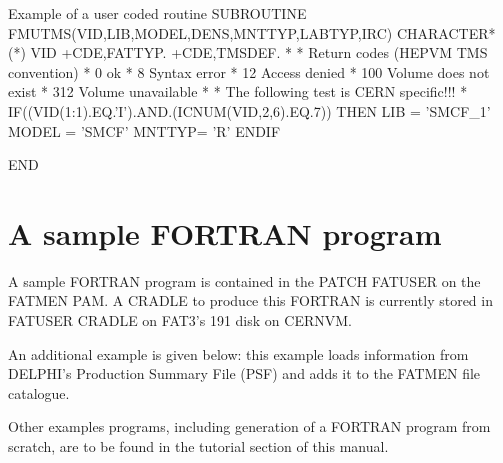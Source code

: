 \begin{XMPt}{Example of a user coded \protect{} routine}
      SUBROUTINE FMUTMS(VID,LIB,MODEL,DENS,MNTTYP,LABTYP,IRC)
      CHARACTER*(*) VID
+CDE,FATTYP.
+CDE,TMSDEF.
*
*     Return codes (HEPVM TMS convention)
*                   0   ok
*                   8   Syntax error
*                   12  Access denied
*                   100 Volume does not exist
*                   312 Volume unavailable
*
*     The following test is CERN specific!!!
*
      IF((VID(1:1).EQ.'I').AND.(ICNUM(VID,2,6).EQ.7)) THEN
         LIB = 'SMCF_1'
         MODEL = 'SMCF'
         MNTTYP= 'R'
      ENDIF

      END
\end{XMPt}
\section{A sample FORTRAN program}
\par
{}
A sample FORTRAN program is contained in the PATCH FATUSER on the FATMEN
PAM.
A CRADLE to produce this FORTRAN is currently stored in FATUSER CRADLE
on FAT3's 191 disk on CERNVM.
\par
An additional example is given below: this example loads information from
DELPHI's Production Summary File (PSF) and adds it to the FATMEN file
catalogue.
\par
Other examples programs, including generation of a FORTRAN program
from scratch, are to be found in the tutorial section of this
manual.

